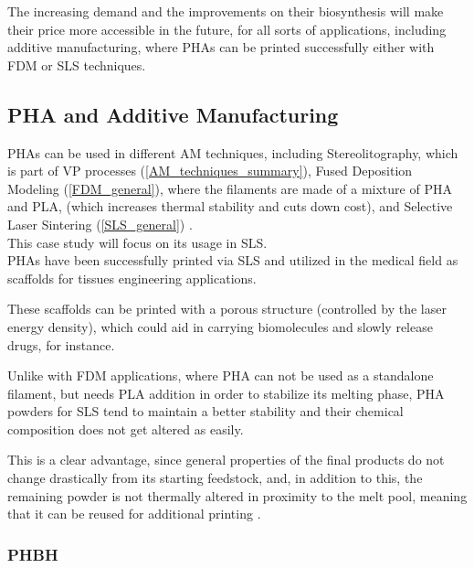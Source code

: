 \documentclass{article}
\begin{document}
    The increasing demand and the improvements on their biosynthesis will make their price more accessible in the future, for all sorts of 
    applications, including additive manufacturing, where PHAs can be printed successfully either with FDM or SLS techniques. \clearpage

    
    \subsection{PHA and Additive Manufacturing \label{PHA_in_Additive}}

    PHAs can be used in different AM techniques, including Stereolitography, which is part of VP processes (\ref{AM_techniques_summary}), 
    Fused Deposition Modeling (\ref{FDM_general}), where the filaments are made of a mixture of PHA and PLA, 
    (which increases thermal stability and cuts down cost), and 
    Selective Laser Sintering (\ref{SLS_general}) \autocite{Kovalcik_PHA_Review}. \\ 

    This case study will focus on its usage in SLS. \\ 

    PHAs have been successfully printed via SLS and utilized in the medical field as scaffolds for tissues engineering applications. 

    These scaffolds can be printed with a porous structure (controlled by the laser energy density), 
    which could aid in carrying biomolecules and slowly release drugs, for instance.
    
    Unlike with FDM applications, where PHA can not be used as a standalone filament, but needs PLA addition in order to stabilize its melting 
    phase, PHA powders for SLS tend to maintain a better stability and their chemical composition does not get altered as easily. 

    This is a clear advantage, since general properties of the final products do not change drastically from its starting feedstock, 
    and, in addition to this, the remaining powder is not thermally altered in proximity to the melt pool, meaning that it can 
    be reused for additional printing \autocite{Kovalcik_PHA_Review}.  \\
        
    \subsubsection{PHBH \label{PHBH}}
\end{document}
